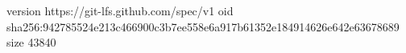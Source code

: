 version https://git-lfs.github.com/spec/v1
oid sha256:942785524e213c466900c3b7ee558e6a917b61352e184914626e642e63678689
size 43840
